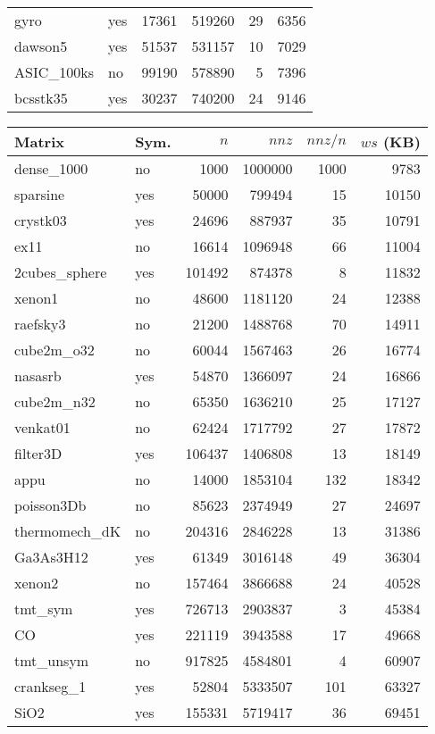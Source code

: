 \documentclass[11pt]{article}
\begin{document}
\begin{table}[!t]
{\begin{tabularx}{0.485\textwidth}{@{}ll@{\ \ }rrrr@{}}
gyro & yes & 17361 & 519260 & 29 & 6356 \\
dawson5 & yes & 51537 & 531157 & 10 & 7029 \\
ASIC\_100ks & no & 99190 & 578890 & 5 & 7396 \\
bcsstk35 & yes & 30237 & 740200 & 24 & 9146 \\
\bottomrule
\end{tabularx}
\hfill
\begin{tabularx}{0.485\textwidth}{@{}l@{\ \ }l@{\ \ }r@{\ \ }r@{\ \ }r@{\ \ }r@{}}
\toprule
Matrix & Sym. & $n$ & $nnz$ & $nnz/n$ & $ws$ (KB)\\
\midrule
dense\_1000 & no & 1000 & 1000000 & 1000 & 9783 \\
sparsine & yes & 50000 & 799494 & 15 & 10150 \\
crystk03 & yes & 24696 & 887937 & 35 & 10791 \\
ex11 & no & 16614 & 1096948 & 66 & 11004 \\
2cubes\_sphere & yes & 101492 & 874378 & 8 & 11832 \\
xenon1 & no & 48600 & 1181120 & 24 & 12388 \\
raefsky3 & no & 21200 & 1488768 & 70 & 14911 \\
cube2m\_o32 & no & 60044 & 1567463 & 26 & 16774 \\
nasasrb & yes & 54870 & 1366097 & 24 & 16866 \\
cube2m\_n32 & no & 65350 & 1636210 & 25 & 17127 \\
venkat01 & no & 62424 & 1717792 & 27 & 17872 \\
filter3D & yes & 106437 & 1406808 & 13 & 18149 \\
appu & no & 14000 & 1853104 & 132 & 18342 \\
poisson3Db & no & 85623 & 2374949 & 27 & 24697 \\
thermomech\_dK & no & 204316 & 2846228 & 13 & 31386 \\
Ga3As3H12 & yes & 61349 & 3016148 & 49 & 36304 \\
xenon2 & no & 157464 & 3866688 & 24 & 40528 \\
tmt\_sym & yes & 726713 & 2903837 & 3 & 45384 \\
CO & yes & 221119 & 3943588 & 17 & 49668 \\
tmt\_unsym & no & 917825 & 4584801 & 4 & 60907 \\
crankseg\_1 & yes & 52804 & 5333507 & 101 & 63327 \\
SiO2 & yes & 155331 & 5719417 & 36 & 69451 \\

\end{tabularx}}
\end{table}
\end{document}
